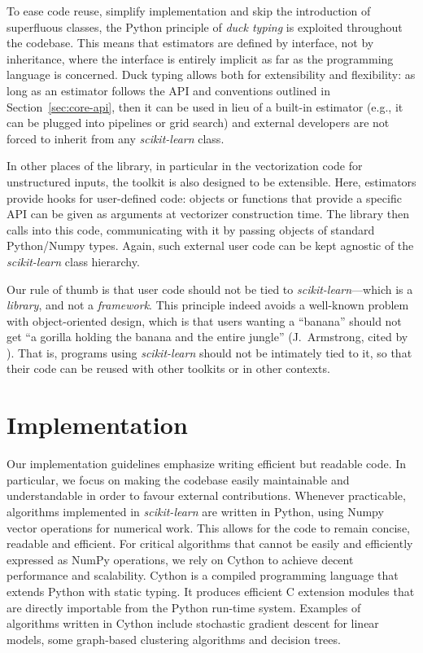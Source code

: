 \documentclass{llncs}
\newcommand{\sklearn}{\textit{scikit-learn}\xspace}
\begin{document}
To ease code reuse, simplify implementation and skip the introduction of
superfluous classes, the Python principle of \textit{duck typing} is exploited
throughout the codebase. This means that estimators are defined by interface,
not by inheritance, where the interface is entirely implicit
as far as the programming language is concerned.
Duck typing allows both for extensibility and
flexibility: as long as an estimator follows the API and conventions
outlined in Section~\ref{sec:core-api}, then it can be used in lieu of a
built-in estimator (e.g., it can be plugged into pipelines or grid search)
and external developers are not forced to inherit from any \sklearn class.

In other places of the library, in particular in the vectorization code
for unstructured inputs, the toolkit is also designed to be
extensible. Here, estimators provide hooks for user-defined code: objects or
functions that provide a specific API can be given as arguments at vectorizer
construction time. The library then calls into this code, communicating with it by passing objects of standard Python/Numpy types.
Again, such external user code can be kept agnostic of the \sklearn
class hierarchy.

Our rule of thumb is that user code should not be tied to \sklearn---which is a
\textit{library}, and not a \textit{framework}. This principle indeed avoids a
well-known problem with object-oriented design, which is that users wanting a
``banana'' should not get ``a gorilla holding the banana and the entire jungle''
(J.~Armstrong, cited by \citealp[p.~213]{seibel2009coders}).
That is, programs using \sklearn should not be intimately tied to it,
so that their code can be reused with other toolkits or in other contexts.


\section{Implementation}
\label{sec:implementation}

Our implementation guidelines emphasize writing efficient but readable code.
In particular, we focus on making the codebase easily maintainable and
understandable in order to favour external contributions. Whenever practicable,
algorithms implemented in \sklearn are written in Python,
using Numpy vector operations for numerical work.
This allows for the code to remain concise, readable and
efficient. For critical algorithms that cannot be easily and efficiently
expressed as NumPy operations, we rely on Cython \citep{behnel2011cython}
to achieve decent performance and scalability. Cython is a
compiled programming language that extends Python with static typing. It
produces efficient C extension modules that are directly importable from the
Python run-time system. Examples of algorithms written in Cython include
stochastic gradient descent for linear models, some graph-based clustering
algorithms and decision trees.
\end{document}
